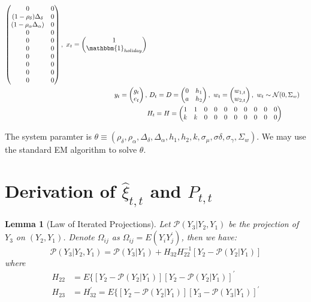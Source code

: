 \documentclass[12pt]{article}
\newtheorem{lemma}{Lemma}
\numberwithin{equation}{section}
\begin{document}
\begin{align*}
\begin{pmatrix}
        0 & 0 \\
        (1-\rho_{\delta})\Delta_{\delta} & 0 \\
        (1-\rho_{\alpha}\Delta_{\alpha}) & 0 \\
        0 & 0 \\
        0 & 0 \\
        0 & 0 \\
        0 & 0 \\
        0 & 0 \\
        0 & 0 \\
        0 & 0 
    \end{pmatrix},
    \ 
    x_t = \begin{pmatrix}
        1 \\
        \mathbbm{1}_{holiday}
    \end{pmatrix} \\
    y_t = \begin{pmatrix}
        g_t \\
        e_t 
    \end{pmatrix},
    &\ 
    D_t = D = \begin{pmatrix}
        0 & h_1 \\
        a & h_2
    \end{pmatrix},
    \ 
    w_t = \begin{pmatrix}
        w_{1,t} \\
        w_{2,t}
    \end{pmatrix} 
    , \ w_t\sim\mathcal{N}(0,\Sigma_{w}) \\
    & H_t = H = \begin{pmatrix}
        1 & 1 & 0 & 0 & 0 & 0 & 0 & 0 & 0 & 0 \\
        k & k & 0 & 0 & 0 & 0 & 0 & 0 & 0 & 0
    \end{pmatrix}
\end{align*}

The system paramter is $\theta\equiv(\rho_{\delta},\rho_{\alpha}, \Delta_{\delta}, \Delta_{\alpha}, h_1, h_2, k, \sigma_{\mu}, \sigma{\delta}, \sigma_{\gamma}, \Sigma_w)$. We may use the standard EM algorithm to solve $\theta$.

\printbibliography
\pagebreak
\appendix
\section{Derivation of $\hat{\xi}_{t,t}$ and $P_{t,t}$}

\begin{lemma}[Law of Iterated Projections] \label{lem:1}
    Let $\mathcal{P}(Y_3|Y_2,Y_1)$ be the projection of $Y_3$ on $(Y_2, Y_1)$. Denote $\Omega_{ij}$ as $\Omega_{ij} = E(Y_iY_j^{'})$, then we have:
    \[
        \mathcal{P}(Y_3|Y_2,Y_1) = \mathcal{P}(Y_3|Y_1)+H_{32}H_{22}^{-1}[Y_2 - \mathcal{P}(Y_2|Y_1)]
    \]
    where 
    \begin{align*}
        H_{22} &= E\{[Y_2-\mathcal{P}(Y_2|Y_1)][Y_2-\mathcal{P}(Y_2|Y_1)]^{'} \\
        H_{23} &= H_{32}^{'} = E\{[Y_2-\mathcal{P}(Y_2|Y_1)][Y_3-\mathcal{P}(Y_3|Y_1)]^{'} 
    \end{align*}

\end{lemma}
\end{document}
